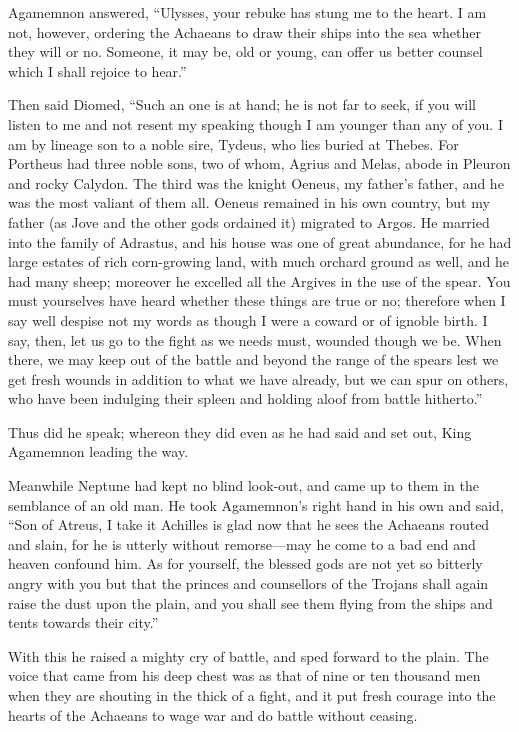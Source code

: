 Agamemnon answered, “Ulysses, your rebuke has stung me to the heart. I am
not, however, ordering the Achaeans to draw their ships into the sea
whether they will or no. Someone, it may be, old or young, can offer us
better counsel which I shall rejoice to hear.”

Then said Diomed, “Such an one is at hand; he is not far to seek, if you
will listen to me and not resent my speaking though I am younger than any
of you. I am by lineage son to a noble sire, Tydeus, who lies buried at
Thebes. For Portheus had three noble sons, two of whom, Agrius and Melas,
abode in Pleuron and rocky Calydon. The third was the knight Oeneus, my
father’s father, and he was the most valiant of them all. Oeneus remained
in his own country, but my father (as Jove and the other gods ordained it)
migrated to Argos. He married into the family of Adrastus, and his house
was one of great abundance, for he had large estates of rich corn-growing
land, with much orchard ground as well, and he had many sheep; moreover he
excelled all the Argives in the use of the spear. You must yourselves have
heard whether these things are true or no; therefore when I say well
despise not my words as though I were a coward or of ignoble birth. I say,
then, let us go to the fight as we needs must, wounded though we be. When
there, we may keep out of the battle and beyond the range of the spears
lest we get fresh wounds in addition to what we have already, but we can
spur on others, who have been indulging their spleen and holding aloof
from battle hitherto.”

Thus did he speak; whereon they did even as he had said and set out, King
Agamemnon leading the way.

Meanwhile Neptune had kept no blind look-out, and came up to them in the
semblance of an old man. He took Agamemnon’s right hand in his own and
said, “Son of Atreus, I take it Achilles is glad now that he sees the
Achaeans routed and slain, for he is utterly without remorse—may he
come to a bad end and heaven confound him. As for yourself, the blessed
gods are not yet so bitterly angry with you but that the princes and
counsellors of the Trojans shall again raise the dust upon the plain, and
you shall see them flying from the ships and tents towards their city.”

With this he raised a mighty cry of battle, and sped forward to the plain.
The voice that came from his deep chest was as that of nine or ten
thousand men when they are shouting in the thick of a fight, and it put
fresh courage into the hearts of the Achaeans to wage war and do battle
without ceasing.

